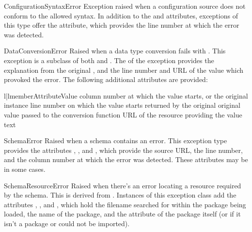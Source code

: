 \documentclass{howto}
\begin{document}
\begin{excdesc}{ConfigurationSyntaxError}
  Exception raised when a configuration source does not conform to the
  allowed syntax.  In addition to the  and
   attributes, exceptions of this type offer the
   attribute, which provides the line number at which
  the error was detected.
\end{excdesc}

\begin{excdesc}{DataConversionError}
  Raised when a data type conversion fails with
  .  This exception is a subclass of both
   and .  The
   of the exception provides the explanation from the
  original , and the line number and URL of the
  value which provoked the error.  The following additional attributes
  are provided:

  \begin{tableii}{l|l}{member}{Attribute}{Value}
           {column number at which the value starts, or }
           {the original  instance}
           {line number on which the value starts}
           { returned by the original }
           {original value passed to the conversion function}
           {URL of the resource providing the value text}
  \end{tableii}
\end{excdesc}

\begin{excdesc}{SchemaError}
  Raised when a schema contains an error.  This exception type
  provides the attributes , , and
  , which provide the source URL, the line number, and
  the column number at which the error was detected.  These attributes
  may be  in some cases.
\end{excdesc}

\begin{excdesc}{SchemaResourceError}
  Raised when there's an error locating a resource required by the
  schema.  This is derived from .  Instances of
  this exception class add the attributes ,
  , and , which hold the filename
  searched for within the package being loaded, the name of the
  package, and the  attribute of the package itself (or
   if it isn't a package or could not be imported).
\end{excdesc}
\end{document}
